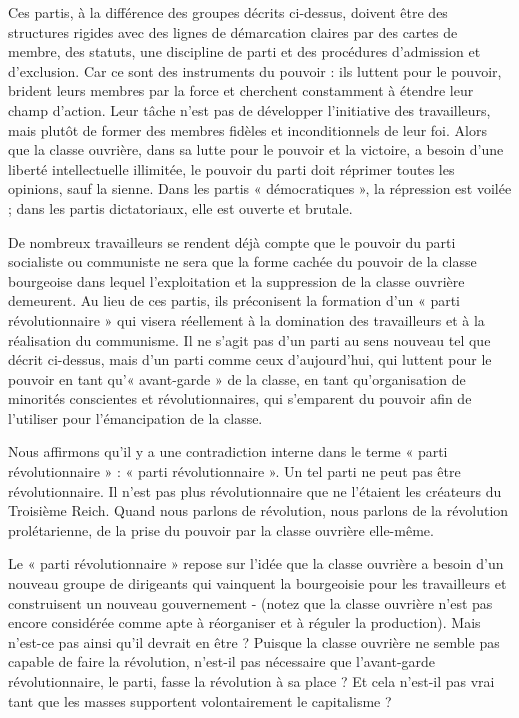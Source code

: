Ces partis, à la différence des groupes décrits ci-dessus, doivent être des structures rigides avec des lignes de démarcation claires par des cartes de membre, des statuts, une discipline de parti et des procédures d'admission et d'exclusion. Car ce sont des instruments du pouvoir : ils luttent pour le pouvoir, brident leurs membres par la force et cherchent constamment à étendre leur champ d'action. Leur tâche n'est pas de développer l'initiative des travailleurs, mais plutôt de former des membres fidèles et inconditionnels de leur foi. Alors que la classe ouvrière, dans sa lutte pour le pouvoir et la victoire, a besoin d'une liberté intellectuelle illimitée, le pouvoir du parti doit réprimer toutes les opinions, sauf la sienne. Dans les partis « démocratiques », la répression est voilée ; dans les partis dictatoriaux, elle est ouverte et brutale.

De nombreux travailleurs se rendent déjà compte que le pouvoir du parti socialiste ou communiste ne sera que la forme cachée du pouvoir de la classe bourgeoise dans lequel l'exploitation et la suppression de la classe ouvrière demeurent. Au lieu de ces partis, ils préconisent la formation d'un « parti révolutionnaire » qui visera réellement à la domination des travailleurs et à la réalisation du communisme. Il ne s'agit pas d'un parti au sens nouveau tel que décrit ci-dessus, mais d'un parti comme ceux d'aujourd'hui, qui luttent pour le pouvoir en tant qu'« avant-garde » de la classe, en tant qu'organisation de minorités conscientes et révolutionnaires, qui s'emparent du pouvoir afin de l'utiliser pour l'émancipation de la classe.

Nous affirmons qu'il y a une contradiction interne dans le terme « parti révolutionnaire » : « parti révolutionnaire ». Un tel parti ne peut pas être révolutionnaire. Il n'est pas plus révolutionnaire que ne l'étaient les créateurs du Troisième Reich. Quand nous parlons de révolution, nous parlons de la révolution prolétarienne, de la prise du pouvoir par la classe ouvrière elle-même.

Le « parti révolutionnaire » repose sur l'idée que la classe ouvrière a besoin d'un nouveau groupe de dirigeants qui vainquent la bourgeoisie pour les travailleurs et construisent un nouveau gouvernement - (notez que la classe ouvrière n'est pas encore considérée comme apte à réorganiser et à réguler la production). Mais n'est-ce pas ainsi qu'il devrait en être ? Puisque la classe ouvrière ne semble pas capable de faire la révolution, n'est-il pas nécessaire que l'avant-garde révolutionnaire, le parti, fasse la révolution à sa place ? Et cela n'est-il pas vrai tant que les masses supportent volontairement le capitalisme ?

